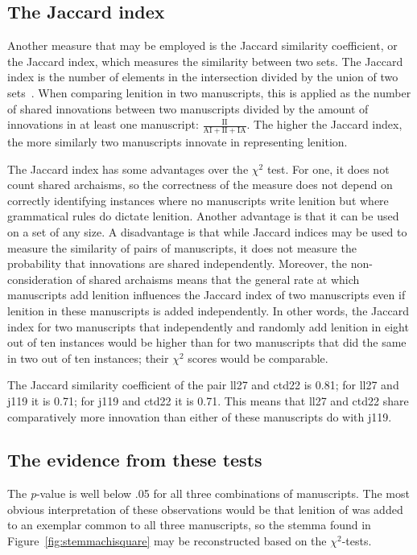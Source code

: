 \subsection{The Jaccard index}
\label{sec:jaccard-index}

Another measure that may be employed is the Jaccard similarity coefficient, or the Jaccard index, which measures the similarity between two sets. The Jaccard index is the number of elements in the intersection divided by the union of two sets~\autocite{LW_DistanceSets71}. When comparing lenition in two manuscripts, this is applied as the number of shared innovations between two manuscripts divided by the amount of innovations in at least one manuscript: \(\frac{\text{II}}{\text{AI}+\text{II}+\text{IA}}\). The higher the Jaccard index, the more similarly two manuscripts innovate in representing lenition.

The Jaccard index has some advantages over the \(\chi^2\) test. For one, it does not count shared archaisms, so the correctness of the measure does not depend on correctly identifying instances where no manuscripts write lenition but where grammatical rules do dictate lenition. Another advantage is that it can be used on a set of any size. A disadvantage is that while Jaccard indices may be used to measure the similarity of pairs of manuscripts, it does not measure the probability that innovations are shared independently. Moreover, the non-consideration of shared archaisms means that the general rate at which manuscripts add lenition influences the Jaccard index of two manuscripts even if lenition in these manuscripts is added independently. In other words, the Jaccard index for two manuscripts that independently and randomly add lenition in eight out of ten instances would be higher than for two manuscripts that did the same in two out of ten instances; their \(\chi^2\) scores would be comparable.

The Jaccard similarity coefficient of the pair \gls{ll27} and \gls{ctd22} is 0.81; for \gls{ll27} and \gls{j119} it is 0.71; for \gls{j119} and \gls{ctd22} it is 0.71. This means that \gls{ll27} and \gls{ctd22} share comparatively more innovation than either of these manuscripts do with \gls{j119}.

\subsection{The evidence from these tests}
\label{sec:evidence-from-these}

The \textit{p}-value is well below .05 for all three combinations of manuscripts. The most obvious interpretation of these observations would be that lenition of  was added to an exemplar common to all three manuscripts, so the stemma found in Figure~\ref{fig:stemmachisquare} may be reconstructed based on the \(\chi^2\)-tests.


